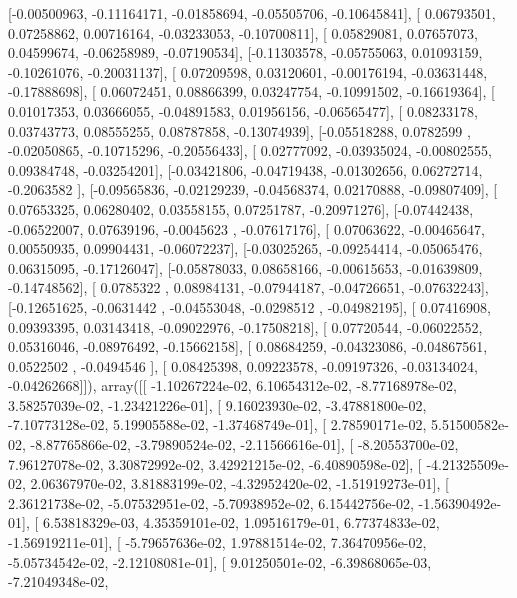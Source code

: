 \documentclass{article}
\begin{document}
       [-0.00500963, -0.11164171, -0.01858694, -0.05505706, -0.10645841],
       [ 0.06793501,  0.07258862,  0.00716164, -0.03233053, -0.10700811],
       [ 0.05829081,  0.07657073,  0.04599674, -0.06258989, -0.07190534],
       [-0.11303578, -0.05755063,  0.01093159, -0.10261076, -0.20031137],
       [ 0.07209598,  0.03120601, -0.00176194, -0.03631448, -0.17888698],
       [ 0.06072451,  0.08866399,  0.03247754, -0.10991502, -0.16619364],
       [ 0.01017353,  0.03666055, -0.04891583,  0.01956156, -0.06565477],
       [ 0.08233178,  0.03743773,  0.08555255,  0.08787858, -0.13074939],
       [-0.05518288,  0.0782599 , -0.02050865, -0.10715296, -0.20556433],
       [ 0.02777092, -0.03935024, -0.00802555,  0.09384748, -0.03254201],
       [-0.03421806, -0.04719438, -0.01302656,  0.06272714, -0.2063582 ],
       [-0.09565836, -0.02129239, -0.04568374,  0.02170888, -0.09807409],
       [ 0.07653325,  0.06280402,  0.03558155,  0.07251787, -0.20971276],
       [-0.07442438, -0.06522007,  0.07639196, -0.0045623 , -0.07617176],
       [ 0.07063622, -0.00465647,  0.00550935,  0.09904431, -0.06072237],
       [-0.03025265, -0.09254414, -0.05065476,  0.06315095, -0.17126047],
       [-0.05878033,  0.08658166, -0.00615653, -0.01639809, -0.14748562],
       [ 0.0785322 ,  0.08984131, -0.07944187, -0.04726651, -0.07632243],
       [-0.12651625, -0.0631442 , -0.04553048, -0.0298512 , -0.04982195],
       [ 0.07416908,  0.09393395,  0.03143418, -0.09022976, -0.17508218],
       [ 0.07720544, -0.06022552,  0.05316046, -0.08976492, -0.15662158],
       [ 0.08684259, -0.04323086, -0.04867561,  0.0522502 , -0.0494546 ],
       [ 0.08425398,  0.09223578, -0.09197326, -0.03134024, -0.04262668]]), array([[ -1.10267224e-02,   6.10654312e-02,  -8.77168978e-02,
          3.58257039e-02,  -1.23421226e-01],
       [  9.16023930e-02,  -3.47881800e-02,  -7.10773128e-02,
          5.19905588e-02,  -1.37468749e-01],
       [  2.78590171e-02,   5.51500582e-02,  -8.87765866e-02,
         -3.79890524e-02,  -2.11566616e-01],
       [ -8.20553700e-02,   7.96127078e-02,   3.30872992e-02,
          3.42921215e-02,  -6.40890598e-02],
       [ -4.21325509e-02,   2.06367970e-02,   3.81883199e-02,
         -4.32952420e-02,  -1.51919273e-01],
       [  2.36121738e-02,  -5.07532951e-02,  -5.70938952e-02,
          6.15442756e-02,  -1.56390492e-01],
       [  6.53818329e-03,   4.35359101e-02,   1.09516179e-01,
          6.77374833e-02,  -1.56919211e-01],
       [ -5.79657636e-02,   1.97881514e-02,   7.36470956e-02,
         -5.05734542e-02,  -2.12108081e-01],
       [  9.01250501e-02,  -6.39868065e-03,  -7.21049348e-02,
\end{document}

